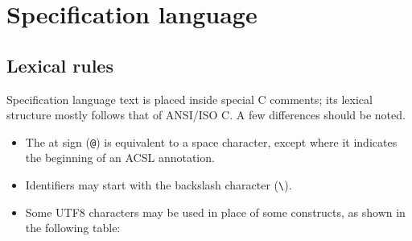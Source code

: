 
\chapter{Specification language}
\label{chap:base}

\section{Lexical rules}
\label{sec:lexicalrules}

Specification language text is placed inside special C comments;
its lexical structure mostly follows that of ANSI/ISO C. A few differences
should be noted.
\begin{itemize}
\item The at sign (\verb|@|) is equivalent
  to a space character, except where it indicates the beginning of an ACSL annotation.
\item Identifiers may start with the backslash character (\verb|\|).
\item Some UTF8 characters may be used in place of some constructs, as
  shown in the following table:


\end{itemize}
